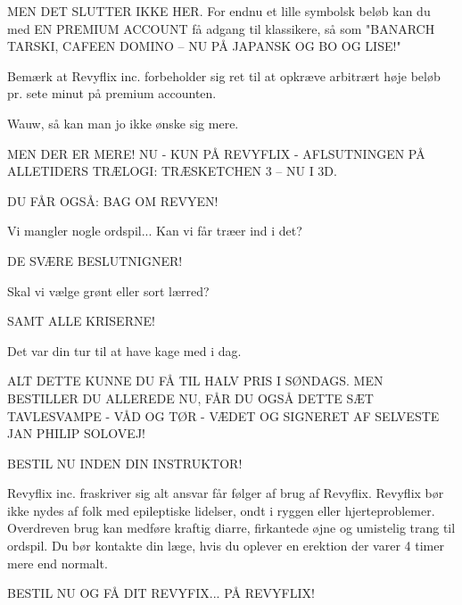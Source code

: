 \documentclass[a4paper,11pt]{article}
\begin{document}
\begin{sketch}

 MEN DET SLUTTER IKKE HER. For endnu et lille symbolsk beløb kan du med EN PREMIUM ACCOUNT få adgang til klassikere, så som "BANARCH TARSKI, CAFEEN DOMINO – NU PÅ JAPANSK OG BO OG LISE!"

 Bemærk at Revyflix inc. forbeholder sig ret
til at opkræve arbitrært høje beløb pr. sete minut på premium accounten.

 Wauw, så kan man jo ikke ønske sig mere.

 MEN DER ER MERE! NU - KUN PÅ REVYFLIX - AFLSUTNINGEN PÅ
ALLETIDERS TRÆLOGI: TRÆSKETCHEN 3 – NU I 3D.

 DU FÅR OGSÅ: BAG OM REVYEN!

 Vi mangler nogle ordspil... Kan vi får træer ind i det?

 DE SVÆRE BESLUTNIGNER!

 Skal vi vælge grønt eller sort lærred?

 SAMT ALLE KRISERNE!

 Det var din tur til at have kage med i dag.

 ALT DETTE KUNNE DU FÅ TIL HALV PRIS I SØNDAGS. MEN BESTILLER DU
ALLEREDE NU, FÅR DU OGSÅ DETTE SÆT TAVLESVAMPE - VÅD OG TØR - VÆDET OG SIGNERET AF SELVESTE JAN PHILIP SOLOVEJ!


 BESTIL NU INDEN DIN INSTRUKTOR!

 Revyflix inc. fraskriver sig alt ansvar får
følger af brug af Revyflix. Revyflix bør ikke nydes af folk med epileptiske
lidelser, ondt i ryggen eller hjerteproblemer. Overdreven brug kan medføre
kraftig diarre, firkantede øjne og umistelig trang til ordspil. Du bør kontakte
din læge, hvis du oplever en erektion der varer 4 timer mere end normalt.

 BESTIL NU OG FÅ DIT REVYFIX... PÅ REVYFLIX!
\end{sketch}
\end{document}
